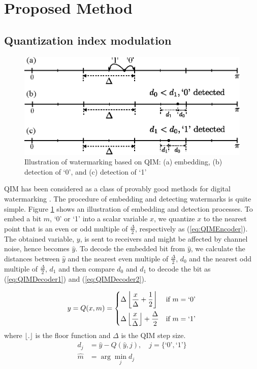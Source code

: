 \section {Proposed Method}
\subsection{Quantization index modulation}
\begin{figure}[bt]
\center
\includegraphics[width=.9\columnwidth]{QIMDemo_v1.eps}
\caption{Illustration of watermarking based on QIM: (a) embedding, (b) detection of `0', and (c) detection of `1'}
\label{fig:QIM}
\end{figure}
QIM has been considered as a class of provably good methods for digital watermarking \cite{qim}. The procedure of embedding and detecting watermarks is quite simple. Figure \ref{fig:QIM} shows an illustration of embedding and detection processes. To embed a bit $m$, `0' or `1' into a scalar variable $x$, we quantize $x$ to the nearest point that is an even or odd multiple of $\frac{\Delta}{2}$, respectively as (\ref{eq:QIMEncoder}). The obtained variable, $y$, is sent to receivers and might be affected by channel noise, hence becomes $\hat{y}$. To decode the embedded bit from $\hat{y}$, we calculate the distances between $\hat{y}$ and the nearest even multiple of $\frac{\Delta}{2}$, $d_0$ and the nearest odd multiple of $\frac{\Delta}{2}$, $d_1$ and then compare $d_0$ and $d_1$ to decode the bit as (\ref{eq:QIMDecoder1}) and (\ref{eq:QIMDecoder2}).

\label{eq:QIMEncoder}
\begin{align}
\label{eq:QIMEncoder}
y = Q(x,m) =
\begin{dcases} 
\Delta\left\lfloor\frac{x}{\Delta}+\frac{1}{2}\right\rfloor &\mbox{if } m = \mbox{`0'}\\ 
\Delta\left\lfloor\frac{x}{\Delta}\right\rfloor + \frac{\Delta}{2} &\mbox{if } m = \mbox{`1'}
\end{dcases}
\end{align}
where $\lfloor .\rfloor$ is the floor function and $\Delta$ is the QIM step size.
\begin{align}
\label{eq:QIMDecoder1}
d_j &= \hat{y} - Q(\hat{y},j), \quad j = \{\mbox{`0'},\mbox{`1'}\} \\
\label{eq:QIMDecoder2}
\hat{m} &= \arg\min_j d_j
\end{align}

